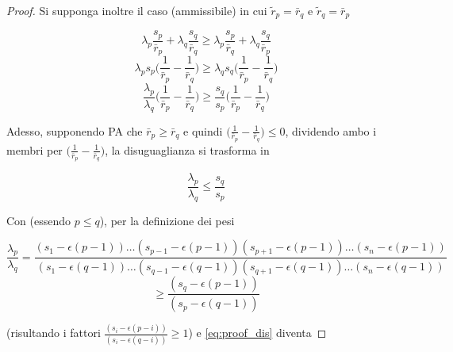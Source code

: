 \begin{proof}
    Si supponga inoltre il caso (ammissibile) in cui $\tilde{r}_p = \bar{r}_q$ e $\tilde{r}_q = \bar{r}_p$  
    
    \begin{equation*}
        \lambda_p \frac{s_p}{\bar{r}_p} + \lambda_{q} \frac{s_{q}}{\bar{r}_{q}} \geq
        \lambda_p \frac{s_p}{\bar{r}_q} + \lambda_{q} \frac{s_{q}}{\bar{r}_{p}}
        \label{eq:}
    \end{equation*}
    \begin{equation*}
        \lambda_p s_p \bigg( \frac{1}{\bar{r}_p} - \frac{1}{\bar{r}_q}\bigg) \geq 
        \lambda_q s_q \bigg( \frac{1}{\bar{r}_p} - \frac{1}{\bar{r}_q} \bigg)
        \label{eq:proof}
    \end{equation*}
    \begin{equation*}
        \frac{\lambda_p}{\lambda_q}  \bigg( \frac{1}{\bar{r}_p} - \frac{1}{\bar{r}_q}\bigg) \geq 
        \frac{s_q}{s_p} \bigg( \frac{1}{\bar{r}_p} - \frac{1}{\bar{r}_q} \bigg)
        \label{eq:proof}
    \end{equation*}
    
    Adesso, supponendo PA che $\bar{r}_p \geq \bar{r}_q$ e quindi $\bigg( \frac{1}{\bar{r}_p} - \frac{1}{\bar{r}_q} \bigg) \leq 0$,
    dividendo ambo i membri per $\bigg( \frac{1}{\bar{r}_p} - \frac{1}{\bar{r}_q} \bigg)$, la disuguaglianza si trasforma in
    
    \begin{equation}
        \frac{\lambda_p}{\lambda_q} \leq 
        \frac{s_q}{s_p}
        \label{eq:proof_dis}
    \end{equation}
    
    Con (essendo $p \leq q$), per la definizione dei pesi
    
    \begin{equation*}
        \frac{\lambda_p}{\lambda_q} = \frac{(s_1 - \epsilon(p-1))\dots(s_{p-1} - \epsilon(p-1))(s_{p+1} - \epsilon(p-1))
        \dots(s_n - \epsilon(p-1))}
        {(s_1 - \epsilon(q-1))\dots(s_{q-1} - \epsilon(q-1))(s_{q+1} - \epsilon(q-1))\dots(s_n - \epsilon(q-1))}
        \label{eq:}
    \end{equation*}
    \begin{equation*}
        \geq \frac{(s_q - \epsilon(p-1))}
        {(s_p - \epsilon(q-1))}
        \label{eq:}
    \end{equation*}
    
    \noindent
    (risultando i fattori $\frac{(s_i - \epsilon(p-i))}{(s_{i} - \epsilon(q-i))} \geq 1$) e
    \ref{eq:proof_dis} diventa
    

\end{proof}
